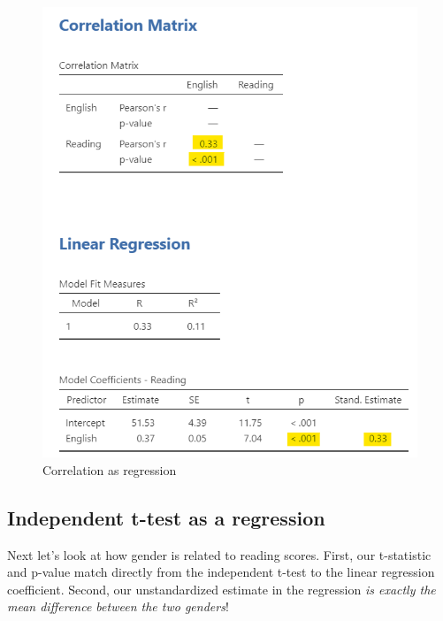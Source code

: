 \documentclass[
]{book}
\begin{document}
\begin{figure}

{\centering \includegraphics[width=1\linewidth]{images/14-regression-wrap-up/correlation} 

}

\caption{Correlation as regression}\label{fig:unnamed-chunk-1}
\end{figure}

\hypertarget{independent-t-test-as-a-regression}{%
\subsection{Independent t-test as a regression}\label{independent-t-test-as-a-regression}}

Next let's look at how gender is related to reading scores. First, our t-statistic and p-value match directly from the independent t-test to the linear regression coefficient. Second, our unstandardized estimate in the regression \emph{is exactly the mean difference between the two genders}!
\end{document}
